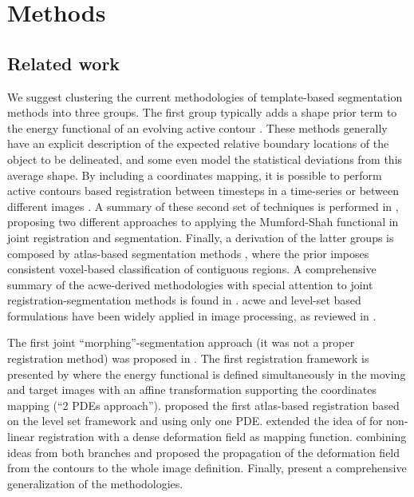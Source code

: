 \section{Methods}
\label{sec:methods}
%
\subsection{Related work}
\label{sec:methods_background}

We suggest clustering the 
current methodologies of template-based segmentation methods into three groups. 
The first group typically adds a shape prior term to the energy functional of 
an evolving active contour \citep{bresson_variational_2006,
chan_level_2005,chen_using_2002,cremers_kernel_2006,gastaud_combining_2004}.
These methods generally have an explicit description of the expected relative boundary 
locations of the object to be delineated, and some even model the statistical deviations
from this average shape. By including a coordinates mapping, it is possible to perform
active contours based registration between timesteps in a time-series or between different
images \citep{bertalmio_morphing_2000,wyatt_map_2003,paragios_level_2003,vemuri_joint_2003,
yezzi_variational_2003}.
A summary of these second set of techniques is performed in \citep{droske_mumfordshah_2009},
proposing two different approaches to applying the Mumford-Shah \citep{mumford_optimal_1989}
functional in joint registration and segmentation. Finally, a derivation of the 
latter groups is composed by atlas-based segmentation methods 
\citep{gorthi_segmentation_2009,gorthi_active_2011,pohl_unifying_2005,
pohl_bayesian_2006,wang_joint_2006}, where the prior 
imposes consistent voxel-based classification of contiguous regions.
A comprehensive summary of the \gls{acwe}-derived methodologies with special attention
to joint registration-segmentation methods is found in \citep{gorthi_active_2011}.
\Gls{acwe} and level-set based formulations have been widely applied in image
processing, as reviewed in \citep{suri_shape_2002}.

The first joint ``morphing''-segmentation approach (it was not a proper
registration method) was proposed in \citep{bertalmio_morphing_2000}. The first
registration framework is presented by \citep{yezzi_variational_2001} where the
energy functional is defined simultaneously in the moving and target images with
an affine transformation supporting the coordinates mapping (``2 PDEs approach'').
\citep{vemuri_joint_2003} proposed the first atlas-based registration based on the 
level set framework and using only one PDE. \citep{unal_coupled_2005} extended the 
idea of \citep{bertalmio_morphing_2000,yezzi_variational_2001} for non-linear 
registration with a dense deformation field as mapping function. \citep{droske_mumfordshah_2009}
combining ideas from both branches and proposed the propagation of the 
deformation field from the contours to the whole image definition. Finally,
\citep{gorthi_active_2011} present a comprehensive generalization of the methodologies.


